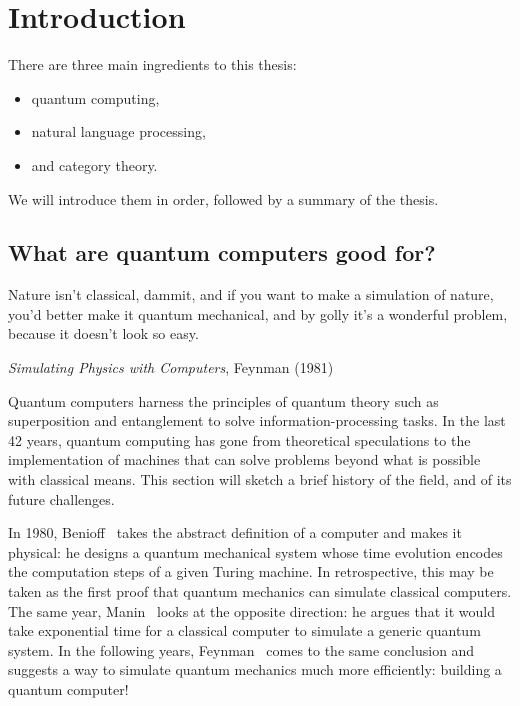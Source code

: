 
\chapter*{Introduction}

There are three main ingredients to this thesis:

\begin{itemize}
\item quantum computing,
\item natural language processing,
\item and category theory.
\end{itemize}

We will introduce them in order, followed by a summary of the thesis.

\section*{What are quantum computers good for?}
\epigraph{
Nature isn't classical, dammit, and if you want to make a simulation of
nature, you'd better make it quantum mechanical, and by golly it's a
wonderful problem, because it doesn't look so easy.
}{\textit{Simulating Physics with Computers}, Feynman (1981)}

Quantum computers harness the principles of quantum theory such as
superposition and entanglement to solve information-processing tasks. In
the last 42 years, quantum computing has gone from theoretical
speculations to the implementation of machines that can solve problems
beyond what is possible with classical means. This section will sketch a
brief history of the field, and of its future challenges.

In 1980, Benioff~\cite{Benioff80} takes the abstract definition of a computer
and makes it physical: he designs a quantum mechanical system whose time evolution
encodes the computation steps of a given Turing machine. In
retrospective, this may be taken as the first proof that quantum
mechanics can simulate classical computers. The same year, Manin~\cite{Manin80} looks
at the opposite direction: he argues that it would take exponential time
for a classical computer to simulate a generic quantum system.
In the following years, Feynman~\cite{Feynman82,Feynman85} comes to the same
conclusion and suggests a way to simulate quantum mechanics much more
efficiently: building a quantum computer!

